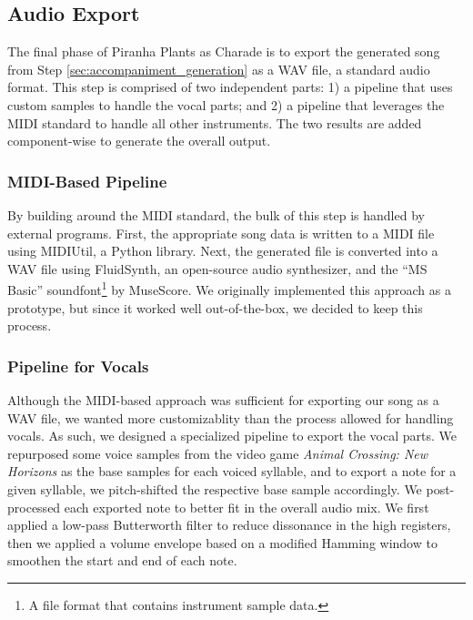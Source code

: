 \subsection{Audio Export}
\label{sec:audio_export}

The final phase of Piranha Plants as Charade is to export the generated song from Step \ref{sec:accompaniment_generation} as a WAV file, a standard audio format. This step is comprised of two independent parts: 1) a pipeline that uses custom samples to handle the vocal parts; and 2) a pipeline that leverages the MIDI standard to handle all other instruments. The two results are added component-wise to generate the overall output.

\subsubsection{MIDI-Based Pipeline}

By building around the MIDI standard, the bulk of this step is handled by external programs. First, the appropriate song data is written to a MIDI file using MIDIUtil, a Python library. Next, the generated file is converted into a WAV file using FluidSynth, an open-source audio synthesizer, and the ``MS Basic'' soundfont\footnote{A file format that contains instrument sample data.} by MuseScore. We originally implemented this approach as a prototype, but since it worked well out-of-the-box, we decided to keep this process.

\subsubsection{Pipeline for Vocals}

Although the MIDI-based approach was sufficient for exporting our song as a WAV file, we wanted more customizablity than the process allowed for handling vocals. As such, we designed a specialized pipeline to export the vocal parts. We repurposed some voice samples from the video game \emph{Animal Crossing: New Horizons} as the base samples for each voiced syllable, and to export a note for a given syllable, we pitch-shifted the respective base sample accordingly. We post-processed each exported note to better fit in the overall audio mix. We first applied a low-pass Butterworth filter to reduce dissonance in the high registers, then we applied a volume envelope based on a modified Hamming window to smoothen the start and end of each note.

